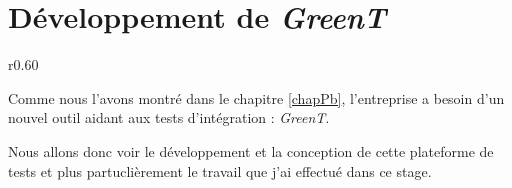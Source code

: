 \chapter{Développement de \textit{\textit{GreenT}}}\label{chapGreent}
\begin{wrapfigure}{r}{0.60\textwidth}
\vspace{-25px}
\hspace{-30px}
\begin{minipage}{0.67\textwidth}
\minitoc
\end{minipage}
\end{wrapfigure}

Comme nous l'avons montré dans le chapitre \ref{chapPb}, l'entreprise a besoin d'un nouvel outil aidant aux tests d'intégration : \textit{GreenT}. 

Nous allons donc voir le développement et la conception de cette plateforme de tests et plus partuclièrement le travail que j'ai effectué dans ce stage.

	

